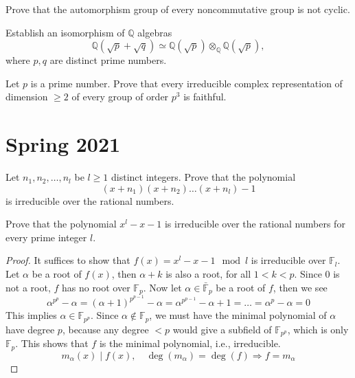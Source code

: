 \documentclass[openany]{book}
\newcommand{\F}{\mathbb{F}}
\begin{document}
\begin{prob}
    Prove that the automorphism group of every noncommutative group is not cyclic.
\end{prob}


\begin{prob}
    Establish an isomorphism of \(\mathbb{Q}\) algebras 
    \[\mathbb{Q}(\sqrt{p} + \sqrt{q}) \simeq \mathbb{Q}(\sqrt{p}) \otimes_{\mathbb{Q}} \mathbb{Q}(\sqrt{p}),\] 
    where \(p, q\) are distinct prime numbers.
\end{prob}


\begin{prob}
    Let \(p\) is a prime number. Prove that every irreducible complex representation of dimension \(\geq 2\) of every group of order \(p^3\) is faithful.
\end{prob}




\chapter{Spring 2021}


\begin{prob}
    Let \(n_{1}, n_{2}, \ldots, n_{l}\) be \(l \geq 1\) distinct integers. Prove that the polynomial 
    \[(x + n_{1})(x + n_{2}) \ldots (x + n_{l}) - 1\] 
    is irreducible over the rational numbers.
\end{prob}


\begin{prob}
    Prove that the polynomial \(x^{l} - x - 1\) is irreducible over the rational numbers for every prime integer \(l\).
\end{prob}
\begin{proof}
    It suffices to show that $f(x)=x^l-x-1\mod l$ is irreducible over $\F_l$. Let $\alpha$ be a root of $f(x)$, then $\alpha+k$ is also a root, for all $1<k<p$. Since $0$ is not a root, $f$ has no root over $\F_p$. Now let $\alpha\in\bar{\F}_p$ be a root of $f$, then we see 
    \begin{equation*}
        \alpha^{p^p}-\alpha=(\alpha+1)^{p^{p-1}}-\alpha=\alpha^{p^{p-1}}-\alpha+1=\dots=\alpha^p-\alpha=0
    \end{equation*}
    This implies $\alpha\in\F_{p^p}$. Since $\alpha\not\in\F_p$, we must have the minimal polynomial of $\alpha$ have degree $p$, because any degree $<p$ would give a subfield of $\F_{p^p}$, which is only $\F_p$. This shows that $f$ is the minimal polynomial, i.e., irreducible. 
    \begin{equation*}
        m_\alpha(x)\mid f(x), \quad \deg(m_\alpha)=\deg(f)\Rightarrow f=m_\alpha
    \end{equation*}
\end{proof}
\end{document}
